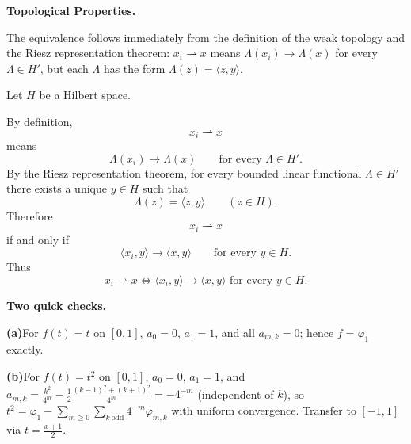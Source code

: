 \begin{problem}[CP-II-0343]
\label{prob:cp-ii-0343}
\textbf{Topological Properties.}

\hspace*{1.5em}The equivalence follows immediately from the definition of the weak topology
		and the Riesz representation theorem:
		$x_i\rightharpoonup x$ means
		$\Lambda(x_i)\to\Lambda(x)$ for every $\Lambda\in H'$,
		but each $\Lambda$ has the form $\Lambda(z)=\langle z,y\rangle$.
\end{problem}

\begin{solution}
Let \(H\) be a Hilbert space.

By definition,
\[
x_i\rightharpoonup x
\]
means
\[
\Lambda(x_i)\to\Lambda(x)
\qquad
\text{for every }\Lambda\in H'.
\]
By the Riesz representation theorem, for every bounded linear functional
\(\Lambda\in H'\) there exists a unique \(y\in H\) such that
\[
\Lambda(z)=\langle z,y\rangle
\qquad(z\in H).
\]
Therefore
\[
x_i\rightharpoonup x
\]
if and only if
\[
\langle x_i,y\rangle
\to
\langle x,y\rangle
\qquad
\text{for every }y\in H.
\]
Thus
\[
\boxed{
x_i\rightharpoonup x
\iff
\langle x_i,y\rangle\to\langle x,y\rangle
\text{ for every }y\in H.
}
\]
\end{solution}


\begin{problem}[CP-II-0344]
\label{prob:cp-ii-0344}
\textbf{Two quick checks.}

\hfill

		\par\smallskip\noindent\textbf{(a)}\quad For $f(t)=t$ on $[0,1]$, $a_0=0$, $a_1=1$, and all $a_{m,k}=0$; hence $f=\varphi_1$ exactly.
		\par\smallskip\noindent\textbf{(b)}\quad For $f(t)=t^2$ on $[0,1]$, $a_0=0$, $a_1=1$, and
		\(
		a_{m,k}=\frac{k^2}{4^m}-\tfrac12\frac{(k-1)^2+(k+1)^2}{4^m}=-4^{-m}
		\)
		(independent of $k$), so
		\(
		t^2=\varphi_1-\sum_{m\ge0}\sum_{k\ \mathrm{odd}}4^{-m}\varphi_{m,k}
		\)
		with uniform convergence. Transfer to $[-1,1]$ via $t=\tfrac{x+1}{2}$.
\end{problem}

